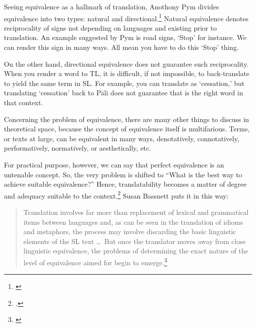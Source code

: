 Seeing equivalence as a hallmark of translation, Anothony Pym divides equivalence into two types: natural and directional.\footnote{\citealp{pym:exploring}} Natural equivalence denotes reciprocality of signs not depending on languages and existing prior to translation. An example suggested by Pym is road signs, `Stop' for instance. We can render this sign in many ways. All mean you have to do this `Stop' thing.

On the other hand, directional equivalence does not guarantee such reciprocality. When you render a word to TL, it is difficult, if not impossible, to back-translate to yield the same term in SL. For example, you can translate  as `cessation,' but translating `cessation' back to P\=ali does not guarantee that  is the right word in that context.

Concerning the problem of equivalence, there are many other things to discuss in theoretical space, because the concept of equivalence itself is multifarious. Terms, or texts at large, can be equivalent in many ways, denotatively, connotatively, performatively, normatively, or aesthetically, etc.

For practical purpose, however, we can say that perfect equivalence is an untenable concept. So, the very problem is shifted to ``What is the best way to achieve suitable equivalence?'' Hence, translatability becomes a matter of degree and adequacy suitable to the context.\footnote{\citealp[See][p.~61]{munday:translation}.} Susan Bassnett puts it in this way:

\begin{quote}
Translation involves far more than replacement of lexical and grammatical items between languages and, as can be seen in the translation of idioms and metaphors, the process may involve discarding the basic linguistic elements of the SL text \dots\ But once the translator moves away from close linguistic equivalence, the problems of determining the exact nature of the level of equivalence aimed for begin to emerge.\footnote{\citealp[p.~34]{bassnett:translation}}
\end{quote}

